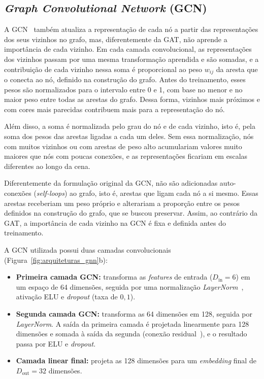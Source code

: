 \subsection{\textit{Graph Convolutional Network} (GCN)}

A GCN~\cite{kipf2016semi} também atualiza a representação de cada nó a partir das representações dos seus vizinhos no grafo, mas, diferentemente da GAT, não aprende a importância de cada vizinho. Em cada camada convolucional, as representações dos vizinhos passam por uma mesma transformação aprendida e são somadas, e a contribuição de cada vizinho nessa soma é proporcional ao peso $w_{ij}$ da aresta que o conecta ao nó, definido na construção do grafo. Antes do treinamento, esses pesos são normalizados para o intervalo entre 0 e 1, com base no menor e no maior peso entre todas as arestas do grafo. Dessa forma, vizinhos mais próximos e com cores mais parecidas contribuem mais para a representação do nó.

Além disso, a soma é normalizada pelo grau do nó e de cada vizinho, isto é, pela soma dos pesos das arestas ligadas a cada um deles. Sem essa normalização, nós com muitos vizinhos ou com arestas de peso alto acumulariam valores muito maiores que nós com poucas conexões, e as representações ficariam em escalas diferentes ao longo da cena.

Diferentemente da formulação original da GCN, não são adicionadas auto-conexões (\textit{self-loops}) ao grafo, isto é, arestas que ligam cada nó a si mesmo. Essas arestas receberiam um peso próprio e alterariam a proporção entre os pesos definidos na construção do grafo, que se buscou preservar. Assim, ao contrário da GAT, a importância de cada vizinho na GCN é fixa e definida antes do treinamento.

A GCN utilizada possui duas camadas convolucionais (Figura~\ref{fig:arquiteturas_gnn}b):

\begin{itemize}
    \item \textbf{Primeira camada GCN:} transforma as \textit{features} de entrada ($D_{\text{in}} = 6$) em um espaço de 64 dimensões, seguida por uma normalização \textit{LayerNorm}~\cite{ba2016layer}, ativação ELU e \textit{dropout} (taxa de $0{,}1$).

    \item \textbf{Segunda camada GCN:} transforma as 64 dimensões em 128, seguida por \textit{LayerNorm}. A saída da primeira camada é projetada linearmente para 128 dimensões e somada à saída da segunda (conexão residual~\cite{he2016deep}), e o resultado passa por ELU e \textit{dropout}.

    \item \textbf{Camada linear final:} projeta as 128 dimensões para um \textit{embedding} final de $D_{\text{out}} = 32$ dimensões.
\end{itemize}

